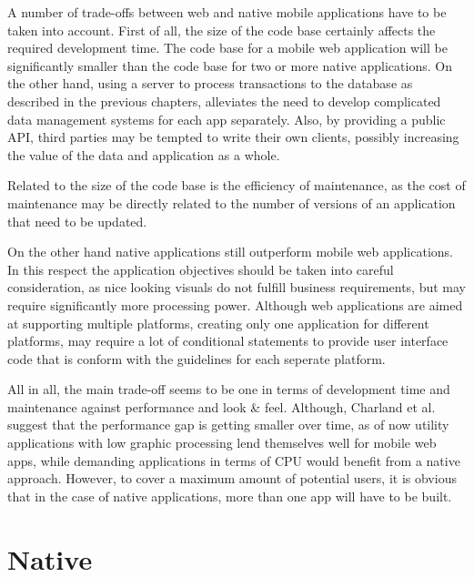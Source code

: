 A number of trade-offs between web and native mobile applications have to be taken into account. First of all, the size of the code base certainly affects the required development time. The code base for a mobile web application will be significantly smaller than the code base for two or more native applications\cite{Charland:2011:MAD:1941487.1941504}. On the other hand, using a server to process transactions to the database as described in the previous chapters, alleviates the need to develop complicated data management systems for each app separately. Also, by providing a public API, third parties may be tempted to write their own clients, possibly increasing the value of the data and application as a whole.

Related to the size of the code base is the efficiency of maintenance, as the cost of maintenance may be directly related to the number of versions of an application that need to be updated\cite{Charland:2011:MAD:1941487.1941504}.

On the other hand native applications still outperform mobile web applications. In this respect the application objectives should be taken into careful consideration, as nice looking visuals do not fulfill business requirements, but may require significantly more processing power. Although web applications are aimed at supporting multiple platforms, creating only one application for different platforms, may require a lot of conditional statements to provide user interface code that is conform with the guidelines for each seperate platform\cite{Charland:2011:MAD:1941487.1941504}.

All in all, the main trade-off seems to be one in terms of development time and maintenance against performance and look \& feel. Although, Charland et al. suggest that the performance gap is getting smaller over time, as of now utility applications with low graphic processing lend themselves well for mobile web apps, while demanding applications in terms of CPU would benefit from a native approach. However, to cover a maximum amount of potential users, it is obvious that in the case of native applications, more than one app will have to be built.


\section{Native }




